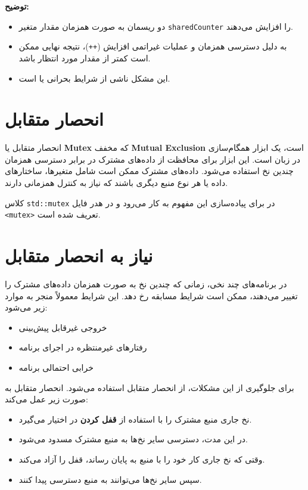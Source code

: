 \documentclass[12pt, a4paper]{report}
\begin{document}
\textbf{توضیح:}
\begin{itemize}
	\item دو ریسمان به صورت همزمان مقدار متغیر \texttt{sharedCounter} را افزایش می‌دهند.
	\item به دلیل دسترسی همزمان و عملیات غیراتمی افزایش (\texttt{++})، نتیجه نهایی ممکن است کمتر از مقدار مورد انتظار باشد.
	\item این مشکل ناشی از شرایط بحرانی یا  است.
\end{itemize}

\section{انحصار متقابل}

انحصار متقابل یا \textbf{Mutex} که مخفف \textbf{Mutual Exclusion} است، یک ابزار همگام‌سازی در زبان  است. این ابزار برای محافظت از داده‌های مشترک در برابر دسترسی همزمان چندین نخ استفاده می‌شود. داده‌های مشترک ممکن است شامل متغیرها، ساختارهای داده یا هر نوع منبع دیگری باشند که نیاز به کنترل همزمانی دارند.

کلاس \texttt{std::mutex} در  برای پیاده‌سازی این مفهوم به کار می‌رود و در هدر فایل \texttt{<mutex>} تعریف شده است.

\section{نیاز به انحصار متقابل}

در برنامه‌های چند نخی، زمانی که چندین نخ به صورت همزمان داده‌های مشترک را تغییر می‌دهند، ممکن است شرایط مسابقه رخ دهد. این شرایط معمولاً منجر به موارد زیر می‌شود:
\begin{itemize}
	\item خروجی غیرقابل پیش‌بینی
	\item رفتارهای غیرمنتظره در اجرای برنامه
	\item خرابی احتمالی برنامه
\end{itemize}

برای جلوگیری از این مشکلات، از انحصار متقابل استفاده می‌شود. انحصار متقابل به صورت زیر عمل می‌کند:
\begin{itemize}
	\item نخ جاری منبع مشترک را با استفاده از \textbf{قفل کردن} در اختیار می‌گیرد.
	\item در این مدت، دسترسی سایر نخ‌ها به منبع مشترک مسدود می‌شود.
	\item وقتی که نخ جاری کار خود را با منبع به پایان رساند، قفل را آزاد می‌کند.
	\item سپس سایر نخ‌ها می‌توانند به منبع دسترسی پیدا کنند.
\end{itemize}
\end{document}
